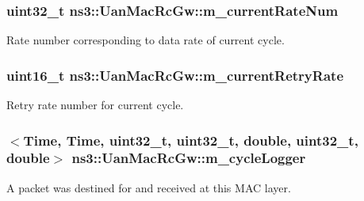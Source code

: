 \subsubsection[{\texorpdfstring{m\+\_\+current\+Rate\+Num}{m_currentRateNum}}]{\setlength{\rightskip}{0pt plus 5cm}uint32\+\_\+t ns3\+::\+Uan\+Mac\+Rc\+Gw\+::m\+\_\+current\+Rate\+Num\hspace{0.3cm}{\ttfamily [private]}}\hypertarget{classns3_1_1UanMacRcGw_ab0db1dee5adabd42e325e8c02937e3f7}{}\label{classns3_1_1UanMacRcGw_ab0db1dee5adabd42e325e8c02937e3f7}


Rate number corresponding to data rate of current cycle. 

\subsubsection[{\texorpdfstring{m\+\_\+current\+Retry\+Rate}{m_currentRetryRate}}]{\setlength{\rightskip}{0pt plus 5cm}uint16\+\_\+t ns3\+::\+Uan\+Mac\+Rc\+Gw\+::m\+\_\+current\+Retry\+Rate\hspace{0.3cm}{\ttfamily [private]}}\hypertarget{classns3_1_1UanMacRcGw_a1fa6713bb1e860c9555ff7a3b7a082c3}{}\label{classns3_1_1UanMacRcGw_a1fa6713bb1e860c9555ff7a3b7a082c3}


Retry rate number for current cycle. 

\subsubsection[{\texorpdfstring{m\+\_\+cycle\+Logger}{m_cycleLogger}}]{$<${\bf Time}, {\bf Time}, uint32\+\_\+t, uint32\+\_\+t, double, uint32\+\_\+t, double$>$ ns3\+::\+Uan\+Mac\+Rc\+Gw\+::m\+\_\+cycle\+Logger\hspace{0.3cm}{\ttfamily [private]}}\hypertarget{classns3_1_1UanMacRcGw_a4c743f84c92dcc29b476cfd229d68dd8}{}\label{classns3_1_1UanMacRcGw_a4c743f84c92dcc29b476cfd229d68dd8}
A packet was destined for and received at this M\+AC layer.

